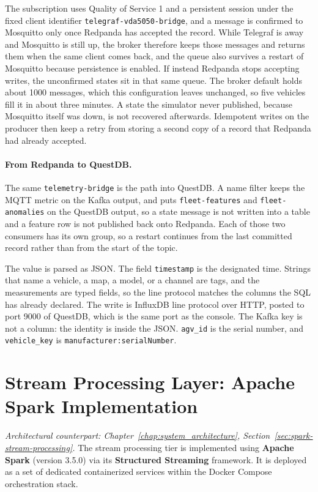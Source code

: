 The subscription uses Quality of Service 1 and a persistent session under the fixed client identifier \texttt{telegraf-vda5050-bridge}, and a message is confirmed to Mosquitto only once Redpanda has accepted the record. While Telegraf is away and Mosquitto is still up, the broker therefore keeps those messages and returns them when the same client comes back, and the queue also survives a restart of Mosquitto because persistence is enabled. If instead Redpanda stops accepting writes, the unconfirmed states sit in that same queue. The broker default holds about 1000 messages, which this configuration leaves unchanged, so five vehicles fill it in about three minutes. A state the simulator never published, because Mosquitto itself was down, is not recovered afterwards. Idempotent writes on the producer then keep a retry from storing a second copy of a record that Redpanda had already accepted.

\paragraph{From Redpanda to QuestDB.}
The same \texttt{telemetry-bridge} is the path into QuestDB. A name filter keeps the MQTT metric on the Kafka output, and puts \texttt{fleet-features} and \texttt{fleet-anomalies} on the QuestDB output, so a state message is not written into a table and a feature row is not published back onto Redpanda. Each of those two consumers has its own group, so a restart continues from the last committed record rather than from the start of the topic.

The value is parsed as JSON. The field \texttt{timestamp} is the designated time. Strings that name a vehicle, a map, a model, or a channel are tags, and the measurements are typed fields, so the line protocol matches the columns the SQL has already declared. The write is InfluxDB line protocol over HTTP, posted to port 9000 of QuestDB, which is the same port as the console. The Kafka key is not a column: the identity is inside the JSON. \texttt{agv\_id} is the serial number, and \texttt{vehicle\_key} is \texttt{manufacturer:serialNumber}.

\section{Stream Processing Layer: Apache Spark Implementation}
\label{sec:spark-implementation}
\textit{Architectural counterpart: Chapter~\ref{chap:system_architecture}, Section~\ref{sec:spark-stream-processing}.}
The stream processing tier is implemented using \textbf{Apache Spark} (version 3.5.0) via its \textbf{Structured Streaming} framework. It is deployed as a set of dedicated containerized services within the Docker Compose orchestration stack.


